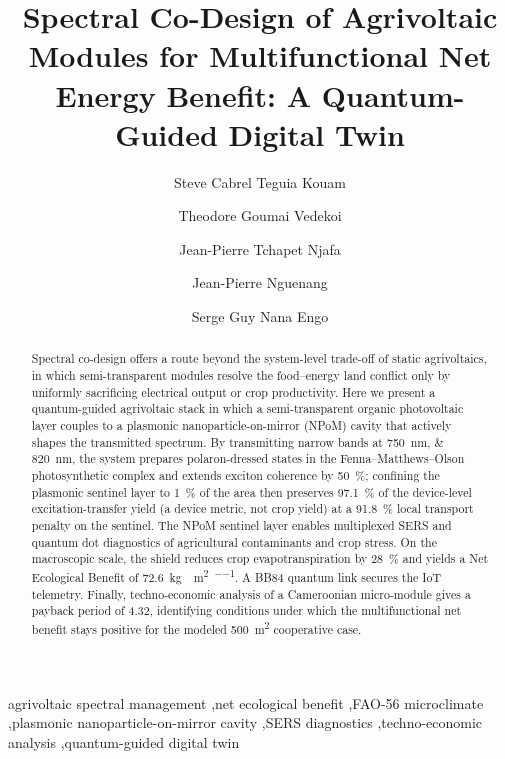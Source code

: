 \documentclass[preprint,12pt]{elsarticle}
\begin{document}
\linenumbers

\begin{frontmatter}

\title{Spectral Co-Design of Agrivoltaic Modules for Multifunctional Net Energy Benefit: A Quantum-Guided Digital Twin}

\author[udla]{Steve Cabrel Teguia Kouam}
\author[uy1]{Theodore Goumai Vedekoi}
\author[uy1]{Jean-Pierre Tchapet Njafa}
\author[udla]{Jean-Pierre Nguenang}
\author[uy1]{Serge Guy Nana Engo}


\address[udla]{Department of Physics, Faculty of Science, University of Douala, Cameroon}
\address[uy1]{Department of Physics, Faculty of Science, University of Yaound\'{e} I, Cameroon}

\begin{abstract}
Spectral co-design offers a route beyond the system-level trade-off of static agrivoltaics, in which semi-transparent modules resolve the food--energy land conflict only by uniformly sacrificing electrical output or crop productivity. Here we present a quantum-guided agrivoltaic stack in which a semi-transparent organic photovoltaic layer couples to a plasmonic nanoparticle-on-mirror (NPoM) cavity that actively shapes the transmitted spectrum. By transmitting narrow bands at \qtylist{750;820}{\nm}, the system prepares polaron-dressed states in the Fenna--Matthews--Olson photosynthetic complex and extends exciton coherence by \qty{50}{\percent}; confining the plasmonic sentinel layer to \qty{1}{\percent} of the area then preserves \qty{97.1}{\percent} of the device-level excitation-transfer yield (a device metric, not crop yield) at a \qty{91.8}{\percent} local transport penalty on the sentinel. The NPoM sentinel layer enables multiplexed SERS and quantum dot diagnostics of agricultural contaminants and crop stress. On the macroscopic scale, the shield reduces crop evapotranspiration by \qty{28}{\percent} and yields a Net Ecological Benefit of \qty{72.6}{\kg{}\per\m\squared\per\yr}. A BB84 quantum link secures the IoT telemetry. Finally, techno-economic analysis of a Cameroonian micro-module gives a payback period of \qty{4.32}{\yr}, identifying conditions under which the multifunctional net benefit stays positive for the modeled \qty{500}{\m\squared} cooperative case.
\end{abstract}

\begin{keyword}
agrivoltaic spectral management \sep net ecological benefit \sep FAO-56 microclimate \sep plasmonic nanoparticle-on-mirror cavity \sep SERS diagnostics \sep techno-economic analysis \sep quantum-guided digital twin
\end{keyword}


\end{frontmatter}
\end{document}
